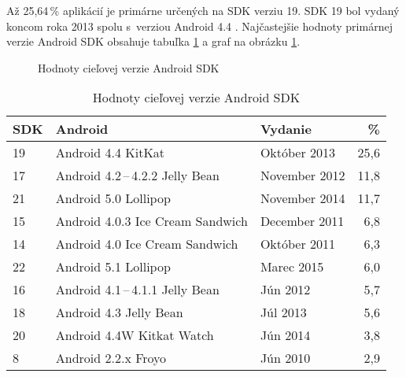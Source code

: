 Až 25,64\,\% aplikácií je primárne určených na SDK verziu 19. SDK 19 bol vydaný koncom roka 2013 spolu s~verziou Android 4.4 . Najčastejšie hodnoty primárnej verzie Android SDK obsahuje tabuľka \ref{tab:targetSdk} a graf na obrázku \ref{targetSdkGraf}.


\begin{figure}[htb]
\centering
\begin{bchart}[min=0,max=30,step=5,unit=\%]
\bcskip{3pt}
\bcskip{3pt}
\bcskip{3pt}
\bcskip{3pt}
\bcskip{3pt}
\bcskip{3pt}
\bcskip{3pt}
\bcskip{3pt}
\bcskip{3pt}
\end{bchart}

\caption{Hodnoty cieľovej verzie Android SDK}
\label{targetSdkGraf}
\end{figure}

\begin{table}[htb]
\centering
  \begin{tabular}{|l l l r|}
    \hline
    \textbf{SDK} & \textbf{Android} & \textbf{Vydanie}& \textbf{\%} \\\hline\hline
    19 & Android 4.4 KitKat & Október 2013 & 25,6 \\
    17 & Android 4.2\,--\,4.2.2 Jelly Bean & November 2012 & 11,8 \\
    21 & Android 5.0 Lollipop & November 2014 & 11,7 \\
    15 & Android 4.0.3 Ice Cream Sandwich & December 2011 & 6,8 \\
    14 & Android 4.0 Ice Cream Sandwich & Október 2011 & 6,3 \\
    22 & Android 5.1 Lollipop & Marec 2015 & 6,0\\
    16 & Android 4.1\,--\,4.1.1 Jelly Bean & Jún 2012 & 5,7 \\
    18 & Android 4.3 Jelly Bean & Júl 2013 & 5,6 \\
    20 & Android 4.4W Kitkat Watch & Jún 2014 & 3,8 \\
    8 & Android 2.2.x Froyo & Jún 2010& 2,9\\
    \hline
  \end{tabular}
  \caption{Hodnoty cieľovej verzie Android SDK}
  \label{tab:targetSdk}
\end{table}